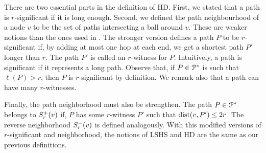 There are two essential parts in the definition of HD.
First, we stated that a path is $r$-significant if it is long enough.
Second, we defined the path neighbourhood of a node $v$ to be the set of paths intersecting a ball around $v$.
These are weaker notions than the ones used in \cite{highway2013}. 
The stronger version defines a path $P$ to be $r$-significant if, by adding at most one hop at each end, we get a shortest path $P'$ longer than $r$.
The path $P'$ is called an $r$-witness for $P$.
Intuitively, a path is significant if it represents a long path.
Observe that, if $P\in\mathcal{P}^*$ is such that $\ell(P)>r$, then $P$ is $r$-significant by definition.
We remark also that a path can have many $r$-witnesses.

Finally, the path neighborhood must also be strengthen.
The path $P\in\mathcal{P}^*$ belongs to $S^+_r(v)$ if, $P$ has some $r$-witness $P'$ such that $\mbox{dist}(v,P')\leq 2r$.
The reverse neighborhood $S^-_r(v)$ is defined analogously.
With this modified versions of $r$-significant and neighborhood, the notions of LSHS and HD are the same as our previous definitions.

